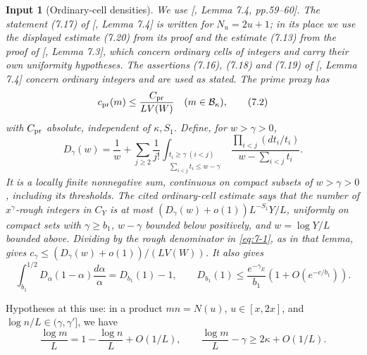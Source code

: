 \documentclass[11pt]{article}
\newtheorem{inputthm}[theorem]{Input}
\theoremstyle{definition}
\theoremstyle{definition}
\begin{document}
\begin{inputthm}[Ordinary-cell densities]\label{input:proxy-density}
We use [, Lemma 7.4, pp.59--60]. The statement (7.17) of [, Lemma 7.4] is written for \(N_u=2u+1\); in its place we use the displayed estimate (7.20) from its proof and the estimate (7.13) from the proof of [, Lemma 7.3], which concern ordinary cells of integers and carry their own uniformity hypotheses. The assertions (7.16), (7.18) and (7.19) of [, Lemma 7.4] concern ordinary integers and are used as stated. The prime proxy has
\begin{equation}
c_{\rm pr}(m)\le \frac{C_{\rm pr}}{LV(W)}
       \quad(m\in\mathcal B_\kappa),                    \tag{7.2}\label{eq:7-2}
\end{equation}
with \(C_{\rm pr}\) absolute, independent of \(\kappa,S_1\). Define, for \(w>\gamma>0\),
\begin{equation}
D_\gamma(w)=\frac1w+
 \sum_{j\ge2}\frac1{j!}
 \int_{\substack{t_i\ge\gamma\ (i<j)\\
                 \sum_{i<j}t_i\le w-\gamma}}
 \frac{\prod_{i<j}(dt_i/t_i)}
                  {w-\sum_{i<j}t_i}.                  \tag{7.3}\label{eq:7-3}
\end{equation}
It is a locally finite nonnegative sum, continuous on compact subsets of \(w>\gamma>0\), including its thresholds. The cited ordinary-cell estimate says that the number of \(x^\gamma\)-rough integers in \(C_Y\) is at most
\((D_\gamma(w)+o(1))L^{-S_1}Y/L\), uniformly on compact sets with \(\gamma\ge b_1\), \(w-\gamma\) bounded below positively, and \(w=\log Y/L\) bounded above. Dividing by the rough denominator in \eqref{eq:7-1}, as in that lemma, gives \(c_\gamma\le(D_\gamma(w)+o(1))/(LV(W))\).
It also gives
\begin{equation}
\int_{b_1}^{1/2}D_\alpha(1-\alpha)\frac{d\alpha}{\alpha}
        =D_{b_1}(1)-1,\qquad
 D_{b_1}(1)\le \frac{e^{-\gamma_E}}{b_1}
                      (1+O(e^{-c/b_1})).               \tag{7.4}\label{eq:7-4}
\end{equation}

\end{inputthm}
Hypotheses at this use: in a product \(mn=N(u)\), \(u\in[x,2x]\), and \(\log n/L\in(\gamma,\gamma']\), we have
\begin{equation}
\frac{\log m}{L}=1-\frac{\log n}{L}+O(1/L),\qquad
 \frac{\log m}{L}-\gamma\ge2\kappa+O(1/L).               \tag{7.5}\label{eq:7-5}
\end{equation}
\end{document}
